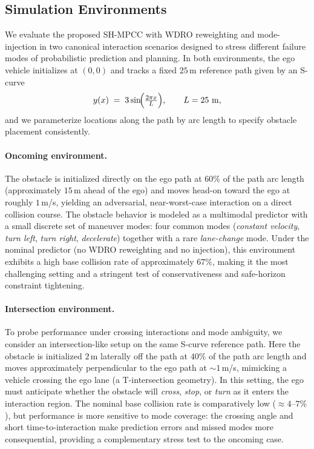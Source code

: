 \documentclass[letterpaper,10pt,conference]{ieeeconf}
\begin{document}
\subsection{Simulation Environments}
\label{sec:envs}

We evaluate the proposed SH-MPCC with WDRO reweighting and mode-injection in two canonical
interaction scenarios designed to stress different failure modes of probabilistic prediction and planning.
In both environments, the ego vehicle initializes at $(0,0)$ and tracks a fixed $25$\,m reference path given
by an S-curve
\[
y(x) \;=\; 3\sin\!\Bigl(\tfrac{2\pi x}{L}\Bigr), \qquad L=25\ \mathrm{m},
\]
and we parameterize locations along the path by arc length to specify obstacle placement consistently.

\paragraph{Oncoming environment.}
The obstacle is initialized directly on the ego path at $60\%$ of the path arc length (approximately
$15$\,m ahead of the ego) and moves head-on toward the ego at roughly $1$\,m/s, yielding an
adversarial, near-worst-case interaction on a direct collision course. The obstacle behavior is modeled
as a multimodal predictor with a small discrete set of maneuver modes: four common modes
(\emph{constant velocity}, \emph{turn left}, \emph{turn right}, \emph{decelerate}) together with a rare
\emph{lane-change} mode. Under the nominal predictor (no WDRO reweighting and no injection),
this environment exhibits a high base collision rate of approximately $67\%$, making it the most
challenging setting and a stringent test of conservativeness and safe-horizon constraint tightening.

\paragraph{Intersection environment.}
To probe performance under crossing interactions and mode ambiguity, we consider an intersection-like
setup on the same S-curve reference path. Here the obstacle is initialized $2$\,m laterally off the path at
$40\%$ of the path arc length and moves approximately perpendicular to the ego path at $\sim 1$\,m/s,
mimicking a vehicle crossing the ego lane (a T-intersection geometry). In this setting, the ego must
anticipate whether the obstacle will \emph{cross}, \emph{stop}, or \emph{turn} as it enters the interaction
region. The nominal base collision rate is comparatively low ($\approx 4$--$7\%$), but performance is more
sensitive to mode coverage: the crossing angle and short time-to-interaction make prediction errors
and missed modes more consequential, providing a complementary stress test to the oncoming case.
\end{document}
